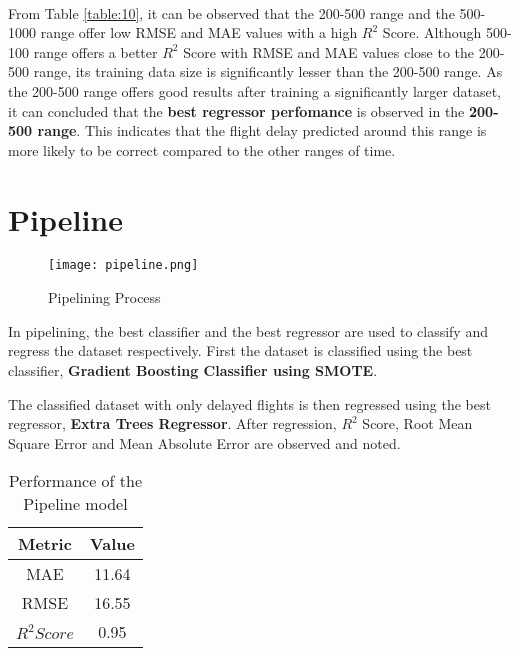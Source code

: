 \documentclass[12pt,letter-paper]{article}
\begin{document}
    \paragraph{}
    From Table \ref{table:10}, it can be observed that the 200-500 range and the 500-1000 range offer low RMSE and MAE values with a high $R^2$ Score. Although 500-100 range offers a better $R^2$ Score with RMSE and MAE values close to the 200-500 range, its training data size is significantly lesser than the 200-500 range. As the 200-500 range offers good results after training a significantly larger dataset, it can concluded that the {\bfseries best regressor perfomance} is observed in the {\bfseries 200-500 range}. This indicates that the flight delay predicted around this range is more likely to be correct compared to the other ranges of time.
    
\section{Pipeline}

    \begin{figure}[H]%
        \begin{center}
            \texttt{[image: pipeline.png]}%
                \caption{Pipelining Process}
                \label{fig:5}
        \end{center}
    \end{figure}
    
    In pipelining, the best classifier and the best regressor are used to classify and regress the dataset respectively. First the dataset is classified using the best classifier, {\bfseries Gradient Boosting Classifier using SMOTE}. 
    
    The classified dataset with only delayed flights is then regressed using the best regressor, {\bfseries Extra Trees Regressor}. After regression, $R^2$ Score, Root Mean Square Error and Mean Absolute Error are observed and noted.

    \begin{table}[H]
            \centering
            \begin{tabular}{ |c|c|} 
                 \hline
                 Metric & Value\\ 
                 \hline
                 MAE & 11.64 \\  
                 \hline
                 RMSE & 16.55\\ 
                 \hline
                 $R^2 Score$ & 0.95\\ 
                 \hline
            \end{tabular}
            \caption{Performance of the Pipeline model}
            \label{table:11}
        \end{table}
    
\end{document}
